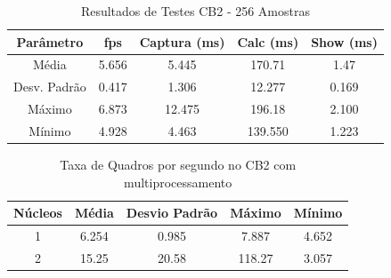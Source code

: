 \documentclass[conference]{IEEEtran}
\begin{document}
%


\begin{table}[h]\centering
\renewcommand{\arraystretch}{1.3}
\caption{Resultados de Testes CB2 - 256 Amostras}
\label{tab:table_pc}
\begin{tabular}{|c|c|c|c|c|}

\hline
\textbf{Parâmetro} & \textbf{fps} & \textbf{Captura (ms)} & \textbf{Calc (ms)} & \textbf{Show (ms)} \\\hline \hline
Média			& 5.656	& 5.445		&	170.71	&	1.47	\\ \hline
Desv. Padrão	& 0.417	& 1.306		&	12.277	&	0.169	\\ \hline
Máximo			& 6.873	& 12.475	&	196.18	&	2.100	\\ \hline
Mínimo			& 4.928	& 4.463		&	139.550	&	1.223	\\ \hline

\end{tabular}
\end{table}

\begin{table}[h]\centering
\renewcommand{\arraystretch}{1.3}
\caption{Taxa de Quadros por segundo no CB2 com multiprocessamento}
\label{tab:table_rpi_cores_fps}
\begin{tabular}{|c|c|c|c|c|}

\hline
\textbf{Núcleos} & \textbf{Média} & \textbf{Desvio Padrão} & \textbf{Máximo} & \textbf{Mínimo} \\\hline \hline
1		& 6.254		& 0.985		&	7.887	&	4.652	\\ \hline
2		& 15.25		& 20.58		&	118.27	&	3.057	\\ \hline

\end{tabular}
\end{table}
\end{document}
